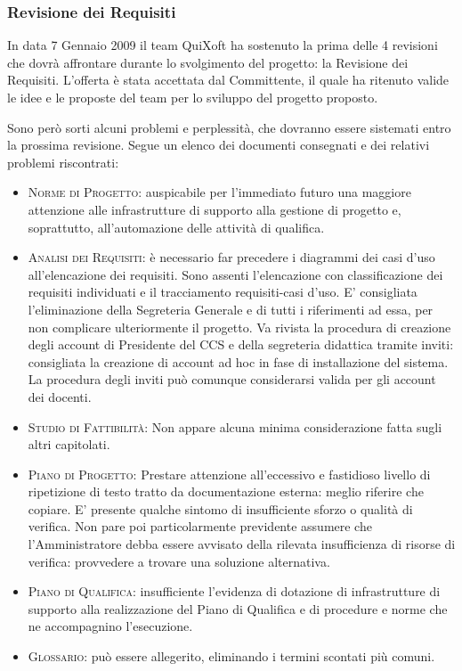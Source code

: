 \documentclass[11pt,a4paper]{article}
\begin{document}
\subsubsection{Revisione dei Requisiti}
In data 7 Gennaio 2009 il team QuiXoft ha sostenuto la prima delle 4 revisioni che dovrà affrontare durante lo svolgimento del progetto: la Revisione dei Requisiti.
L'offerta è stata accettata dal Committente, il quale ha ritenuto valide le idee e le proposte del team per lo sviluppo del progetto proposto.

Sono però sorti alcuni problemi e perplessità, che dovranno essere sistemati entro la prossima revisione.
Segue un elenco dei documenti consegnati e dei relativi problemi riscontrati:
\begin{itemize}
\item \textsc{Norme di Progetto:} auspicabile per l'immediato futuro una maggiore attenzione alle infrastrutture di supporto alla gestione di progetto e, soprattutto, all'automazione delle attività di qualifica.
\item \textsc{Analisi dei Requisiti:} è necessario far precedere i diagrammi dei casi d'uso all'elencazione dei requisiti.
Sono assenti l'elencazione con classificazione dei requisiti individuati e il tracciamento requisiti-casi d'uso.
E' consigliata l'eliminazione della Segreteria Generale e di tutti i riferimenti ad essa, per non complicare ulteriormente il progetto.
Va rivista la procedura di creazione degli account di Presidente del CCS e della segreteria didattica tramite inviti: consigliata la creazione di account ad hoc in fase di installazione del sistema. La procedura degli inviti può comunque considerarsi valida per gli account dei docenti.
\item \textsc{Studio di Fattibilità:} Non appare alcuna minima considerazione fatta sugli altri capitolati.
\item \textsc{Piano di Progetto:} Prestare attenzione all'eccessivo e fastidioso livello di ripetizione di testo tratto da documentazione esterna: meglio riferire che copiare.
E' presente qualche sintomo di insufficiente sforzo o qualità di verifica.
Non pare poi particolarmente previdente assumere che l'Amministratore debba essere avvisato della rilevata insufficienza di risorse di verifica: provvedere a trovare una soluzione alternativa.
\item \textsc{Piano di Qualifica:} insufficiente l'evidenza di dotazione di infrastrutture di supporto alla realizzazione del Piano di Qualifica e di procedure e norme che ne accompagnino l'esecuzione.
\item \textsc{Glossario:} può essere allegerito, eliminando i termini scontati più comuni.
\end{itemize}
\end{document}
